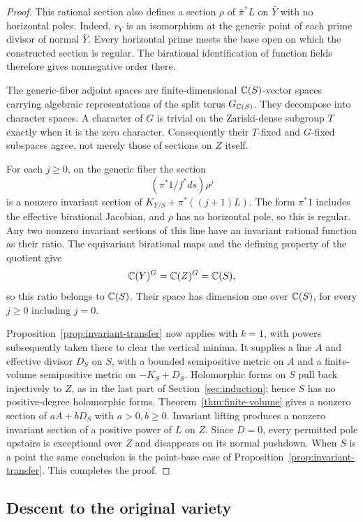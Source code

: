 \begin{proof}
This rational section also defines a section $\rho$ of
$\bar\pi^*L$ on $\bar Y$ with no horizontal poles. Indeed,
$r_Y$ is an isomorphism at the generic point of each prime divisor
of normal $\bar Y$. Every horizontal prime meets the base open on
which the constructed section is regular. The birational identification
of function fields therefore gives nonnegative order there.

The generic-fiber adjoint spaces are finite-dimensional
$\mathbb C(S)$-vector spaces carrying algebraic representations of the
split torus $G_{\mathbb C(S)}$. They decompose into character spaces.
A character of $G$ is trivial on the Zariski-dense subgroup $T$
exactly when it is the zero character. Consequently their
$T$-fixed and $G$-fixed subspaces agree, not merely those of sections
on $Z$ itself.

For each $j\ge0$, on the generic fiber the section
\[
             (\pi^*1/f^*ds)\rho^j
\]
is a nonzero invariant section of
$K_{Y/S}+\pi^*((j+1)L)$. The form $\pi^*1$ includes the effective
birational Jacobian, and $\rho$ has no horizontal pole, so this is
regular. Any two nonzero invariant sections of this line have an
invariant rational function as their ratio. The equivariant birational
maps and the defining property of the quotient give
\[
                    \mathbb C(Y)^G=\mathbb C(Z)^G=\mathbb C(S),
\]
so this ratio belongs to $\mathbb C(S)$. Their
space has dimension one over $\mathbb C(S)$, for every $j\ge0$ including
$j=0$.

Proposition~\ref{prop:invariant-transfer} now applies with $k=1$, with powers
subsequently taken there to clear the vertical minima. It supplies a
line $A$ and effective divisor $D_S$ on $S$, with a bounded
semipositive metric on $A$ and a finite-volume semipositive metric on
$-K_S+D_S$. Holomorphic forms on $S$ pull back injectively to $Z$,
as in the last part of Section~\ref{sec:induction}; hence $S$ has no
positive-degree holomorphic forms. Theorem~\ref{thm:finite-volume}
gives a nonzero section of $aA+bD_S$ with $a>0,b\ge0$.
Invariant lifting produces a nonzero invariant section of a positive
power of $L$ on $Z$. Since $D=0$, every permitted pole upstairs is
exceptional over $Z$ and disappears on its normal pushdown.
When $S$ is a point the same conclusion is the point-base case of
Proposition~\ref{prop:invariant-transfer}. This completes the proof.
\end{proof}

\subsection{Descent to the original variety}

